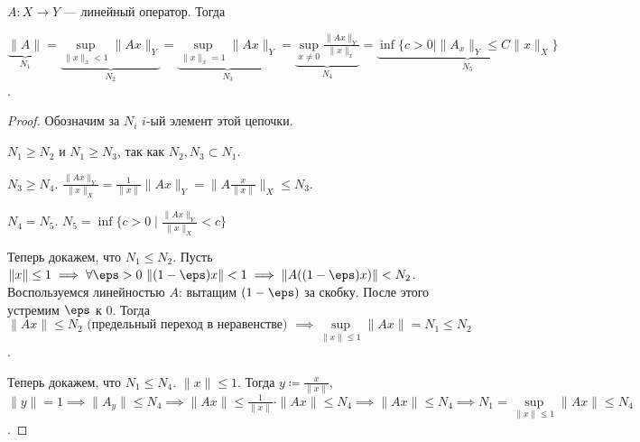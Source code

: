 \begin{theorem}
    $A\!: X \to Y$ --- линейный оператор. Тогда

     $\underbrace{\|A\|}_{N_1} = \underbrace{\sup\limits_{\| x\|_x < 1} \|Ax\|_Y}_{N_2} = \underbrace{\sup\limits_{\| x\|_x = 1} \|Ax\|_Y}_{N_3} = \underbrace{\sup\limits_{x \neq 0} \frac{\|Ax\|_Y}{\|x\|_x}}_{N_4} = \underbrace{\inf\{ c > 0 \mid \|A_x\|_Y \le C \|x\|_X\}}_{N_5}$.
\end{theorem}
\begin{proof}
    Обозначим за $N_i$  $i$-ый элемент этой цепочки. 

     $N_1 \ge N_2$ и $N_1 \ge N_3$,  так как $N_2, N_3 \subset N_1$. 

     $N_3 \ge N_4$. $\frac{\|Ax\|_Y}{\|x\|_X} = \frac{1}{\|x\|}\|Ax\|_Y = \|A \frac{x}{\|x\|}\|_X \le N_3$.

     $N_4 = N_5$. $N_5 = \inf \{ c>0 \mid \frac{\|Ax\|_Y}{\|x\|_X} < c\}$

     Теперь докажем, что $N_1 \le N_2$. Пусть $\| x \| \le 1 \implies \forall \eps > 0\ \| (1-\eps) x \| < 1 \implies \| A((1-\eps)x) \| < N_2$. Воспользуемся линейностью $A$: вытащим  $(1-\eps)$ за скобку. После этого устремим  $\eps$ к 0. Тогда  $\| Ax \| \le N_2\text{ (предельный переход в неравенстве) }\implies \sup\limits_{\| x \| \le 1} \| A x\| = N_1 \le N_2$.

     Теперь докажем, что $N_1 \le N_4$. $\| x \| \le 1$. Тогда $y \coloneqq \frac{x}{\| x \|}$, $\|y\| = 1 \implies \| A_y \| \le N_4 \implies \| Ax \| \le \frac{1}{\|x \|} \cdot \| Ax \| \le N_4 \implies \| Ax \|  \le N_4 \implies N_1 = \sup\limits_{\|x \| \le 1} \|Ax\| \le N_4$.
\end{proof}
